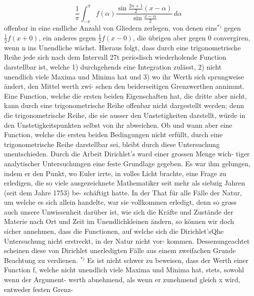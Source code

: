 \documentclass[12pt,a4paper]{book}
\theoremstyle{definition}
\theoremstyle{remark}
\begin{document}
\[
\frac{1}{\pi} \int_{-\pi}^{\pi} f(\alpha) \frac{\sin \frac{2n+1}{2}(x-\alpha)}{\sin \frac{x-\alpha}{2}}\, d\alpha
\]
offenbar  in  eine  endliche  Anzahl  von  Gliedern  zerlegen,  von  denen
eins$^{*)}$  gegen $\frac{1}{2}f(x+0)$,  ein  anderes  gegen  $\frac{1}{2}f(x-0)$,  die  übrigen
aber  gegen  0  convergiren,  wenn  n  ins  Unendliche  wächst.
Hieraus  folgt,  dass  durch  eine  trigonometrische  Reihe  jede  sich
nach  dem  Intervall  27t  periodisch  wiederholende  Function  darstellbar
ist,  welche
1)  durchgehends  eine  Integration  zulässt,
2)  nicht  unendlich  viele  Maxima  und  Minima  hat  und
3)  wo  ihr  Werth  sich  sprungweise  ändert,  den  Mittel werth  zwi-
schen den  beiderseitigen  Grenzwerthen  annimmt.
Eine  Function,  welche  die  ersten  beiden  Eigenschaften  hat,  die
dritte  aber  nicht,  kann  durch  eine  trigonometrische  Reihe  offenbar
nicht  dargestellt  werden;  denn  die  trigonometrische  Reihe,  die  sie
ausser  den  Unstetigkeiten  darstellt,  würde  in  den  Unstetigkeitspunkten
selbst  von  ihr  abweichen.  Ob  und  wann  aber  eine  Function,  welche
die  ersten  beiden  Bedingungen  nicht  erfüllt,  durch  eine  trigonometrische
Reihe  darstellbar  sei,  bleibt  durch  diese  Untersuchung  unentschieden.
Durch  die  Arbeit  Dirichlet's  ward  einer  grossen  Menge  wich-
tiger analytischer  Untersuchungen  eine  feste  Grundlage  gegeben.  Es
war  ihm  gelungen,  indem  er  den  Punkt,  wo  Euler  irrte,  in  volles
Licht  brachte,  eine  Frage  zu  erledigen,  die  so  viele  ausgezeichnete
Mathematiker  seit  mehr  als  siebzig  Jahren  (seit  dem  Jahre  1753)  be-
schäftigt hatte.  In  der  That  für  alle  Fälle  der  Natur,  um  welche  es
sich  allein  handelte,  war  sie  vollkommen  erledigt,  denn  so  gross  auch
unsere  Unwissenheit  darüber  ist,  wie  sich  die  Kräfte  und  Zustände  der
Materie  nach  Ort  und  Zeit  im  Unendlichkleinen  ändern,  so  können
wir  doch  sicher  annehmen,  dass  die  Functionen,  auf  welche  sich  die
Dirichlet'sQhe  Untersuchung  nicht  erstreckt,  in  der  Natur  nicht  vor-
kommen.
Dessenungeachtet  scheinen  diese  von  Dirichlet  unerledigten  Fälle
aus  einem  zweifachen  Grunde  Beachtung  zu  verdienen.
$^{*)}$  Es  ist  nicht  schwer  zu  beweisen,  dass  der  Werth  einer  Function  f,  welche
nicht  unendlich  viele  Maxima  und  Minima  hat,  stets,  sowohl  wenn  der  Argument-
werth  abnehmend,  als  wenn  er  zunehmend  gleich  x  wird,  entweder  festen  Grenz-
\end{document}
